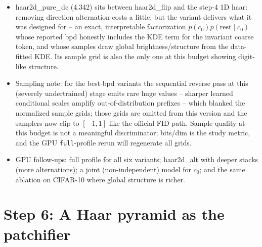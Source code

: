 \documentclass[11pt]{article}
\begin{document}
\begin{itemize}
  \item haar2d\_pure\_dc (4.342) sits between haar2d\_flip and the step-4
        1D haar: removing direction alternation costs a little, but the
        variant delivers what it was designed for -- an exact, interpretable
        factorization $p(c_0)p(\mathrm{rest}\mid c_0)$ whose reported bpd
        honestly includes the KDE term for the invariant coarse token, and
        whose samples draw global brightness/structure from the data-fitted
        KDE. Its sample grid is also the only one at this budget showing
        digit-like structure.
  \item Sampling note: for the best-bpd variants the sequential reverse pass
        at this (severely undertrained) stage emits rare huge values --
        sharper learned conditional scales amplify out-of-distribution
        prefixes -- which blanked the normalized sample grids; those grids
        are omitted from this version and the samplers now clip to $[-1,1]$
        like the official FID path. Sample quality at this budget is not a
        meaningful discriminator; bits/dim is the study metric, and the GPU
        \texttt{full}-profile rerun will regenerate all grids.
  \item GPU follow-ups: full profile for all six variants; haar2d\_alt with
        deeper stacks (more alternations); a joint (non-independent) model
        for $c_0$; and the same ablation on CIFAR-10 where global structure
        is richer.
\end{itemize}

\section{Step 6: A Haar pyramid as the patchifier}
\end{document}
